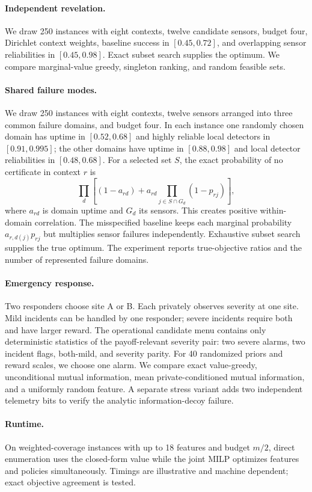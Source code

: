 \documentclass[11pt]{article}
\begin{document}
\paragraph{Independent revelation.}
We draw 250 instances with eight contexts, twelve candidate sensors, budget four, Dirichlet context weights, baseline success in $[0.45,0.72]$, and overlapping sensor reliabilities in $[0.45,0.98]$. Exact subset search supplies the optimum. We compare marginal-value greedy, singleton ranking, and random feasible sets.

\paragraph{Shared failure modes.}
We draw 250 instances with eight contexts, twelve sensors arranged into three common failure domains, and budget four. In each instance one randomly chosen domain has uptime in $[0.52,0.68]$ and highly reliable local detectors in $[0.91,0.995]$; the other domains have uptime in $[0.88,0.98]$ and local detector reliabilities in $[0.48,0.68]$. For a selected set $S$, the exact probability of no certificate in context $r$ is
\[
\prod_d\left[(1-a_{rd})+a_{rd}\prod_{j\in S\cap G_d}(1-p_{rj})\right],
\]
where $a_{rd}$ is domain uptime and $G_d$ its sensors. This creates positive within-domain correlation. The misspecified baseline keeps each marginal probability $a_{r,d(j)}p_{rj}$ but multiplies sensor failures independently. Exhaustive subset search supplies the true optimum. The experiment reports true-objective ratios and the number of represented failure domains.

\paragraph{Emergency response.}
Two responders choose site A or B. Each privately observes severity at one site. Mild incidents can be handled by one responder; severe incidents require both and have larger reward. The operational candidate menu contains only deterministic statistics of the payoff-relevant severity pair: two severe alarms, two incident flags, both-mild, and severity parity. For 40 randomized priors and reward scales, we choose one alarm. We compare exact value-greedy, unconditional mutual information, mean private-conditioned mutual information, and a uniformly random feature. A separate stress variant adds two independent telemetry bits to verify the analytic information-decoy failure.

\paragraph{Runtime.}
On weighted-coverage instances with up to 18 features and budget $m/2$, direct enumeration uses the closed-form value while the joint MILP optimizes features and policies simultaneously. Timings are illustrative and machine dependent; exact objective agreement is tested.
\end{document}
